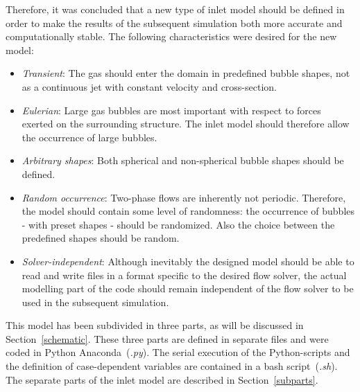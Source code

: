 \documentclass[fleqn,10pt,a4paper,twoside,english]{book}
\begin{document}
\par Therefore, it was concluded that a new type of inlet model should be defined in order to make the results of the subsequent simulation both more accurate and computationally stable. The following characteristics were desired for the new model:
\begin{itemize}
	\item{\textit{Transient}: The gas should enter the domain in predefined bubble shapes, not as a continuous jet with constant velocity and cross-section.}
	\item{\textit{Eulerian}: Large gas bubbles are most important with respect to forces exerted on the surrounding structure. The inlet model should therefore allow the occurrence of large bubbles.}
	\item{\textit{Arbitrary shapes}: Both spherical and non-spherical bubble shapes should be defined.}
	\item{\textit{Random occurrence}: Two-phase flows are inherently not periodic. Therefore, the model should contain some level of randomness: the occurrence of bubbles - with preset shapes - should be randomized. Also the choice between the predefined shapes should be random.}
	\item{\textit{Solver-independent}: Although inevitably the designed model should be able to read and write files in a format specific to the desired flow solver, the actual modelling part of the code should remain independent of the flow solver to be used in the subsequent simulation.}
\end{itemize}
\par This model has been subdivided in three parts, as will be discussed in \mbox{Section \ref{schematic}}. These three parts are defined in separate files and were coded in Python \mbox{Anaconda (\textit{.py})}. The serial execution of the Python-scripts and the definition of case-dependent variables are contained in a bash \mbox{script (\textit{.sh})}. The separate parts of the inlet model are described in \mbox{Section \ref{subparts}}.
\tableofcontents
	

\mainmatter     %
\raggedbottom %
\renewcommand*{\thesection}{\arabic{section}}

\end{document}
